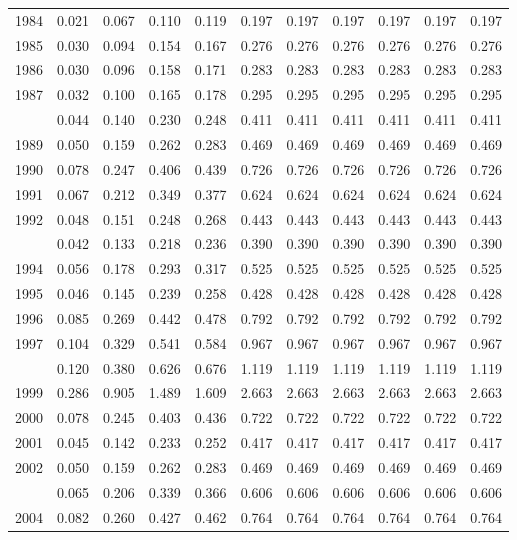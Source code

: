 \documentclass[
]{article}
\begin{document}
\begin{longtable}[t]{lrrrrrrrrrr}
1984 & 0.021 & 0.067 & 0.110 & 0.119 & 0.197 & 0.197 & 0.197 & 0.197 & 0.197 & 0.197\\
1985 & 0.030 & 0.094 & 0.154 & 0.167 & 0.276 & 0.276 & 0.276 & 0.276 & 0.276 & 0.276\\
1986 & 0.030 & 0.096 & 0.158 & 0.171 & 0.283 & 0.283 & 0.283 & 0.283 & 0.283 & 0.283\\
1987 & 0.032 & 0.100 & 0.165 & 0.178 & 0.295 & 0.295 & 0.295 & 0.295 & 0.295 & 0.295\\
\addlinespace
1988 & 0.044 & 0.140 & 0.230 & 0.248 & 0.411 & 0.411 & 0.411 & 0.411 & 0.411 & 0.411\\
1989 & 0.050 & 0.159 & 0.262 & 0.283 & 0.469 & 0.469 & 0.469 & 0.469 & 0.469 & 0.469\\
1990 & 0.078 & 0.247 & 0.406 & 0.439 & 0.726 & 0.726 & 0.726 & 0.726 & 0.726 & 0.726\\
1991 & 0.067 & 0.212 & 0.349 & 0.377 & 0.624 & 0.624 & 0.624 & 0.624 & 0.624 & 0.624\\
1992 & 0.048 & 0.151 & 0.248 & 0.268 & 0.443 & 0.443 & 0.443 & 0.443 & 0.443 & 0.443\\
\addlinespace
1993 & 0.042 & 0.133 & 0.218 & 0.236 & 0.390 & 0.390 & 0.390 & 0.390 & 0.390 & 0.390\\
1994 & 0.056 & 0.178 & 0.293 & 0.317 & 0.525 & 0.525 & 0.525 & 0.525 & 0.525 & 0.525\\
1995 & 0.046 & 0.145 & 0.239 & 0.258 & 0.428 & 0.428 & 0.428 & 0.428 & 0.428 & 0.428\\
1996 & 0.085 & 0.269 & 0.442 & 0.478 & 0.792 & 0.792 & 0.792 & 0.792 & 0.792 & 0.792\\
1997 & 0.104 & 0.329 & 0.541 & 0.584 & 0.967 & 0.967 & 0.967 & 0.967 & 0.967 & 0.967\\
\addlinespace
1998 & 0.120 & 0.380 & 0.626 & 0.676 & 1.119 & 1.119 & 1.119 & 1.119 & 1.119 & 1.119\\
1999 & 0.286 & 0.905 & 1.489 & 1.609 & 2.663 & 2.663 & 2.663 & 2.663 & 2.663 & 2.663\\
2000 & 0.078 & 0.245 & 0.403 & 0.436 & 0.722 & 0.722 & 0.722 & 0.722 & 0.722 & 0.722\\
2001 & 0.045 & 0.142 & 0.233 & 0.252 & 0.417 & 0.417 & 0.417 & 0.417 & 0.417 & 0.417\\
2002 & 0.050 & 0.159 & 0.262 & 0.283 & 0.469 & 0.469 & 0.469 & 0.469 & 0.469 & 0.469\\
\addlinespace
2003 & 0.065 & 0.206 & 0.339 & 0.366 & 0.606 & 0.606 & 0.606 & 0.606 & 0.606 & 0.606\\
2004 & 0.082 & 0.260 & 0.427 & 0.462 & 0.764 & 0.764 & 0.764 & 0.764 & 0.764 & 0.764\\

\end{longtable}
\end{document}
